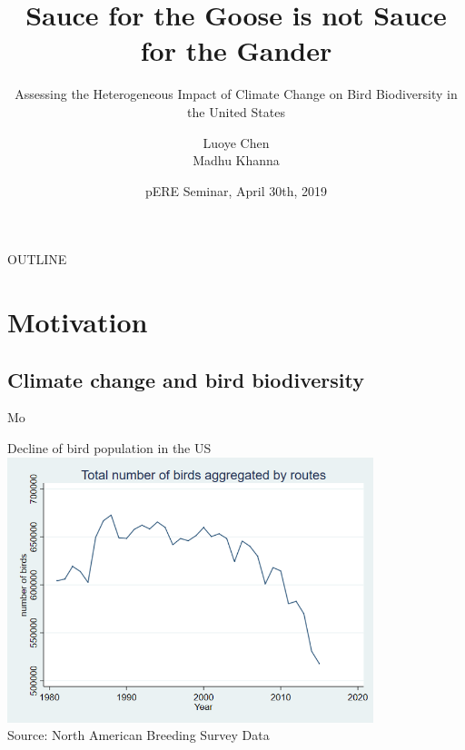 \documentclass{beamer}
\title[Sauce for the Goose is not Sauce for the Gander] %
{Sauce for the Goose is not Sauce for the Gander}
\subtitle
{Assessing the Heterogeneous Impact of Climate Change on Bird Biodiversity in the United States}
\author[Luoye Chen] %
{Luoye Chen\\ Madhu Khanna\inst{1}}
\institute[UIUC-ACE] %
{
  \inst{1}%
  Department of Agricultural and Consumer Economics\\
  University of Illinois
}
\date[pERE 2018] %
{pERE Seminar, April 30th, 2019}
\begin{document}
\begin{frame}
  \titlepage
\end{frame}

\begin{frame}{OUTLINE}
  \tableofcontents
\end{frame}





\section{Motivation}

\subsection{Climate change and bird biodiversity}
Mo
\begin{frame}{Decline of bird population in the US}
  \includegraphics[width=0.8\textwidth]{bird-1.png}\\
  {\footnotesize  Source: North American Breeding Survey Data}
\end{frame}
\end{document}
